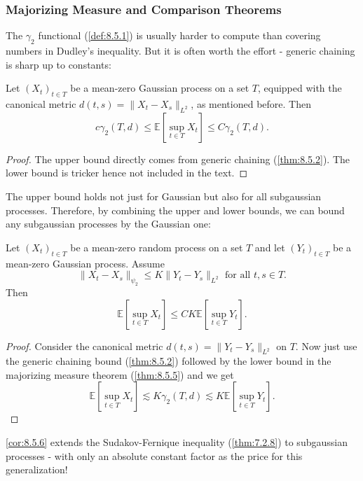 \subsubsection{Majorizing Measure and Comparison Theorems}
The $\gamma_2$ functional (\cref{def:8.5.1}) is usually harder to compute than covering numbers in Dudley's 
inequality. But it is often worth the effort - generic chaining is sharp up to constants:

\begin{theorem}
\label{thm:8.5.5}
Let $(X_t)_{t \in T}$ be a mean-zero Gaussian process on a set $T$, equipped with the canonical metric 
$d(t, s) = \lVert X_t - X_s \rVert_{L^2}$, as mentioned before. Then 
\[ c \gamma_2(T, d) \leq \mathbb{E}\left[ \sup_{t \in T}X_t \right] \leq C \gamma_2(T, d). \]
\end{theorem}

\begin{proof}
The upper bound directly comes from generic chaining (\cref{thm:8.5.2}). The lower bound is tricker hence not 
included in the text.
\end{proof}

The upper bound holds not just for Gaussian but also for all subgaussian processes. Therefore, by combining the 
upper and lower bounds, we can bound any subgaussian processes by the Gaussian one:

\begin{corollary}
\label{cor:8.5.6}
Let $(X_t)_{t \in T}$ be a mean-zero random process on a set $T$ and let $(Y_t)_{t \in T}$ be a mean-zero 
Gaussian process. Assume 
\[ \lVert X_t - X_s \rVert_{\psi_2} \leq K \lVert Y_t - Y_s \rVert_{L^2} \text{ for all } t, s \in T. \]
Then 
\[ \mathbb{E}\left[ \sup_{t \in T}X_t \right] \leq CK \mathbb{E}\left[ \sup_{t \in T}Y_t \right]. \]
\end{corollary}

\begin{proof}
Consider the canonical metric $d(t, s) = \lVert Y_t - Y_s \rVert_{L^2}$ on $T$. Now just use the generic 
chaining bound (\cref{thm:8.5.2}) followed by the lower bound in the majorizing measure theorem 
(\cref{thm:8.5.5}) and we get 
\[ \mathbb{E}\left[ \sup_{t \in T}X_t \right] \lesssim K \gamma_2(T, d) \lesssim 
K \mathbb{E}\left[ \sup_{t \in T}Y_t \right]. \]
\end{proof}

\begin{remark}
\label{rmk:8.5.7}
\cref{cor:8.5.6} extends the Sudakov-Fernique inequality (\cref{thm:7.2.8}) to subgaussian processes - with 
only an absolute constant factor as the price for this generalization!
\end{remark}

